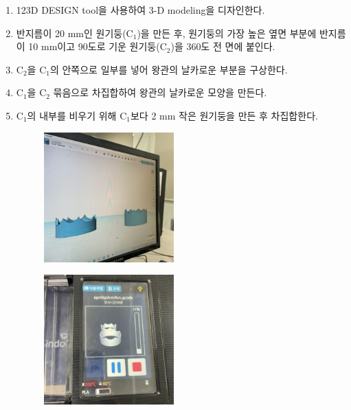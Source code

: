 \documentclass[a4paper, 10pt, nanum]{CSUniSchoolLabReport}
\begin{document}
\begin{enumerate}[label=\arabic*.]
	\item 123D DESIGN tool을 사용하여 3-D modeling을 디자인한다.
	\item 반지름이 20 mm인 원기둥(C$_1$)을 만든 후, 원기둥의 가장 높은 옆면 부분에 반지름이 10 mm이고 90도로 기운 원기둥(C$_2$)을 360도 전 면에 붙인다.
	\item C$_2$을 C$_1$의 안쪽으로 일부를 넣어 왕관의 날카로운 부분을 구상한다.
	\item C$_1$을 C$_2$ 묶음으로 차집합하여 왕관의 날카로운 모양을 만든다.
	\item C$_1$의 내부를 비우기 위해 C$_1$보다 2 mm 작은 원기둥을 만든 후 차집합한다.
	\begin{figure}[htb!]
		\centering
		\begin{minipage}{.5\textwidth}
			\centering
			\includegraphics[width=5cm]{fig7.jpg}
			\label{fig:7}
		\end{minipage}%
		\begin{minipage}{.5\textwidth}
			\centering
			\includegraphics[width=5cm]{fig8.jpg}
			\label{fig:8}
		\end{minipage}
	\end{figure}
\end{enumerate}

\end{document}
